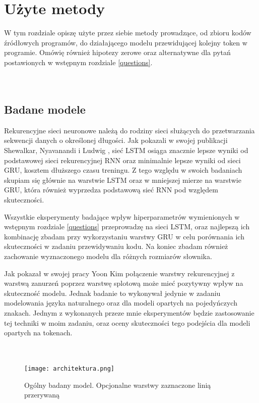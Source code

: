 \newpage %
 

\section{Użyte metody}
W tym rozdziale opiszę użyte przez siebie metody prowadzące, od zbioru kodów źródłowych programów, do działającego modelu 
przewidującej kolejny token w programie. Omówię również hipotezy zerowe oraz alternatywne dla pytań postawionych w wstępnym rozdziale \ref{questions}.\\\\\\ 

\subsection{Badane modele}
Rekurencyjne sieci neuronowe należą do rodziny sieci służących do przetwarzania sekwencji danych o określonej długości. Jak pokazali w swojej publikacji 
Shewalkar, Nyavanandi i Ludwig \cite{lstmvsgru}, sieć LSTM osiąga znacznie lepsze wyniki od podstawowej sieci rekurencyjnej RNN oraz minimalnie lepsze wyniki 
od sieci GRU, kosztem dłuższego czasu treningu. Z tego względu w swoich badaniach skupiam się głównie na warstwie LSTM oraz w mniejszej mierze na warstwie GRU, 
która również wyprzedza podstawową sieć RNN pod względem skuteczności. 

Wszystkie eksperymenty badające wpływ hiperparametrów wymienionych w wstępnym rozdziale \ref{questions} przeprowadzę na sieci LSTM, oraz najlepszą ich kombinację 
zbadam przy wykorzystaniu warstwy GRU w celu porównania ich skuteczności w zadaniu przewidywaniu kodu. Na koniec zbadam również zachowanie wyznaczonego modelu 
dla różnych rozmiarów słownika. 

Jak pokazał w swojej pracy Yoon Kim \cite{kim} połączenie warstwy rekurencyjnej z warstwą zanurzeń poprzez warstwę splotową może mieć pozytywny wpływ na skuteczność 
modelu. Jednak badanie to wykonywał jedynie w zadaniu modelowania języka naturalnego oraz dla modeli opartych na pojedyńczych znakach. Jednym z wykonanych przeze mnie 
eksperymentów będzie zastosowanie tej techniki w moim zadaniu, oraz oceny skuteczności tego podejścia dla modeli opartych na tokenach. \\\\\\

\begin{figure}[!h]
	\caption{Ogólny badany model. Opcjonalne warstwy zaznaczone linią przerywaną}
    \label{fig:architektura}
    \centering \texttt{[image: architektura.png]}
\end{figure}



